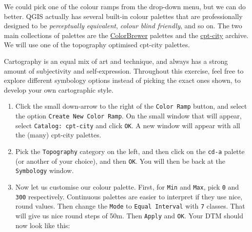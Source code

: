 \documentclass[
  letterpaper,
  DIV=11,
  numbers=noendperiod]{scrreprt}
\begin{document}
We could pick one of the colour ramps from the drop-down menu, but we
can do better. QGIS actually has several built-in colour palettes that
are professionally designed to be \emph{perceptually equivalent},
\emph{colour blind friendly}, and so on. The two main collections of
palettes are the
\href{https://colorbrewer2.org/\#type=sequential&scheme=BuGn&n=3}{ColorBrewer}
palettes and the
\href{http://seaviewsensing.com/pub/cpt-city/}{cpt-city} archive. We
will use one of the topography optimised cpt-city palettes.

\begin{tcolorbox}[enhanced jigsaw, coltitle=black, toprule=.15mm, breakable, opacitybacktitle=0.6, left=2mm, colback=white, leftrule=.75mm, rightrule=.15mm, colbacktitle=quarto-callout-tip-color!10!white, toptitle=1mm, titlerule=0mm, colframe=quarto-callout-tip-color-frame, arc=.35mm, bottomtitle=1mm, opacityback=0, bottomrule=.15mm, title=\textcolor{quarto-callout-tip-color}{\faLightbulb}\hspace{0.5em}{Tip}]

Cartography is an equal mix of art and technique, and always has a
strong amount of subjectivity and self-expression. Throughout this
exercise, feel free to explore different symbology options instead of
picking the exact ones shown, to develop your own cartographic style.

\end{tcolorbox}

\begin{enumerate}
\def\labelenumi{(\arabic{enumi})}
\setcounter{enumi}{200}
\item
  Click the small down-arrow to the right of the \texttt{Color\ Ramp}
  button, and select the option \texttt{Create\ New\ Color\ Ramp}. On
  the small window that will appear, select \texttt{Catalog:\ cpt-city}
  and click \texttt{OK}. A new window will appear with all the (many)
  cpt-city palettes.
\item
  Pick the \texttt{Topography} category on the left, and then click on
  the \texttt{cd-a} palette (or another of your choice), and then
  \texttt{OK}. You will then be back at the \texttt{Symbology} window.
\item
  Now let us customise our colour palette. First, for \texttt{Min} and
  \texttt{Max}, pick \texttt{0} and \texttt{300} respectively.
  Continuous palettes are easier to interpret if they use nice, round
  values. Then change the \texttt{Mode} to \texttt{Equal\ Interval} with
  \texttt{7} classes. That will give us nice round steps of 50m. Then
  \texttt{Apply} and \texttt{OK}. Your DTM should now look like this:
\end{enumerate}
\end{document}
